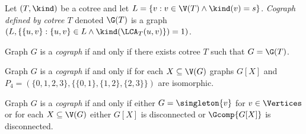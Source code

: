 \begin{defi}\label{codef3}
    Let $(T, \kind)$ be a cotree and let $L = \{v : v \in \V(T) \land \kind(v) = s\}$. \emph{Cograph defined by cotree $T$} denoted $\G(T)$ is a graph $(L, \{\{u,v\} : \{u,v\} \in L \land \kind(\LCA_T(u,v)\}) = 1)$.

    Graph $G$ is a \emph{cograph} if and only if there exists cotree $T$ such that $G = \G(T)$.
\end{defi}

\begin{defi}\label{codef4}
    Graph $G$ is a \emph{cograph} if and only if for each $X \subseteq \V(G)$ graphs $G[X]$ and $P_4 = (\{0,1,2,3\}, \{\{0,1\},\{1,2\},\{2,3\}\})$ are  isomorphic.
\end{defi}

\begin{defi}\label{codef5}
    Graph $G$ is a \emph{cograph} if and only if either $G = \singleton{v}$ for $v \in \Vertices$ or for each $X \subseteq \V(G)$ either $G[X]$ is disconnected or $\Gcomp{G[X]}$ is disconnected.
\end{defi}
